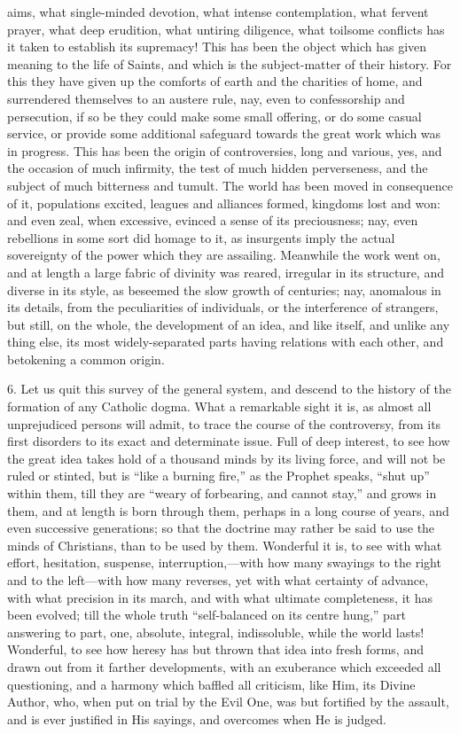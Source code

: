 aims, what single-minded devotion, what intense contemplation, what
fervent prayer, what deep erudition, what untiring diligence, what
toilsome conflicts has it taken to establish its supremacy! This has
been the object which has given meaning to the life of Saints, and
which is the subject-matter of their history. For this they have given
up the comforts of earth and the charities of home, and surrendered
themselves to an austere rule, nay, even to confessorship and
persecution, if so be they could make some small offering, or do some
casual service, or provide some additional safeguard towards the great
work which was in progress. This has been the origin of controversies,
long and various, yes, and the occasion of much infirmity, the test of
much hidden perverseness, and the subject of much bitterness and
tumult. The world has been moved in consequence of it, populations
excited, leagues and alliances formed, kingdoms lost and won: and even
zeal, when excessive, evinced a sense of its preciousness; nay, even
rebellions in some sort did homage to it, as insurgents imply the
actual sovereignty of the power which they are assailing. Meanwhile
the work went on, and at length a large fabric of divinity was reared,
irregular in its structure, and diverse in its style, as beseemed the
slow growth of centuries; nay, anomalous in its details, from the
peculiarities of individuals, or the interference of strangers, but
still, on the whole, the development of an idea, and like itself, and
unlike any thing else, its most widely-separated parts having
relations with each other, and betokening a common origin.

6. Let us quit this survey of the general system, and descend to
the history of the formation of any Catholic dogma. What a remarkable
sight it is, as almost all unprejudiced persons will admit, to trace
the course of the controversy, from its first disorders to its exact
and determinate issue. Full of deep interest, to see how the great
idea takes hold of a thousand minds by its living force, and will not
be ruled or stinted, but is ``like a burning fire,'' as the
Prophet speaks, ``shut up'' within them, till they are
``weary of forbearing, and cannot stay,'' and grows in them,
and at length is born through them, perhaps in a long course of years,
and even successive generations; so that the doctrine may rather be
said to use the minds of Christians, than to be used by them.
Wonderful it is, to see with what effort, hesitation, suspense,
interruption,—with how many swayings to the right and to the left—with
how many reverses, yet with what certainty of advance, with what
precision in its march, and with what ultimate completeness, it has
been evolved; till the whole truth ``self-balanced on its centre
hung,'' part answering to part, one, absolute, integral,
indissoluble, while the world lasts! Wonderful, to see how heresy has
but thrown that idea into fresh forms, and drawn out from it farther
developments, with an exuberance which exceeded all questioning, and a
harmony which baffled all criticism, like Him, its Divine Author, who,
when put on trial by the Evil One, was but fortified by the assault,
and is ever justified in His sayings, and overcomes when He is judged.

